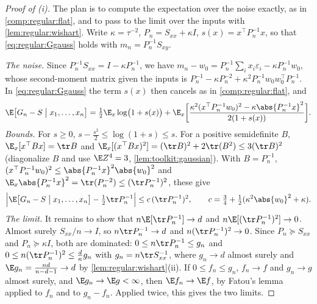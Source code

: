 \begin{refsection}
\begin{proof}[Proof of (i)]
The plan is to compute the expectation over the noise exactly, as in \cref{comp:regular:flat}, and to pass to the limit over the inputs with \cref{lem:regular:wishart}. Write $\kappa=\tau^{-2}$, $P_n=S_{xx}+\kappa I$, $s(x)=x^\top P_n^{-1}x$, so that \eqref{eq:regular:Ggauss} holds with $m_n=P_n^{-1}S_{xy}$.

\emph{The noise.} Since $P_n^{-1}S_{xx}=I-\kappa P_n^{-1}$, we have $m_n-w_0=P_n^{-1}\sum_ix_i\varepsilon_i-\kappa P_n^{-1}w_0$, whose second-moment matrix given the inputs is $P_n^{-1}-\kappa P_n^{-2}+\kappa^2P_n^{-1}w_0w_0^\top P_n^{-1}$. In \eqref{eq:regular:Ggauss} the term $s(x)$ then cancels as in \cref{comp:regular:flat}, and
\[
\E\bigl[G_n-S\bigm|x_1,\dots,x_n\bigr]=\tfrac12\E_x\log\bigl(1+s(x)\bigr)+\E_x\biggl[\frac{\kappa^2(x^\top P_n^{-1}w_0)^2-\kappa\abs{P_n^{-1}x}^2}{2(1+s(x))}\biggr].
\]
\emph{Bounds.} For $s\ge0$, $s-\frac{s^2}2\le\log(1+s)\le s$. For a positive semidefinite $B$, $\E_x[x^\top Bx]=\tr B$ and $\E_x[(x^\top Bx)^2]=(\tr B)^2+2\tr(B^2)\le3(\tr B)^2$ (diagonalize $B$ and use $\E Z^4=3$, \cref{lem:toolkit:gaussian}). With $B=P_n^{-1}$, $(x^\top P_n^{-1}w_0)^2\le\abs{P_n^{-1}x}^2\abs{w_0}^2$ and $\E_x\abs{P_n^{-1}x}^2=\tr(P_n^{-2})\le(\tr P_n^{-1})^2$, these give
\[
\Bigl|\E\bigl[G_n-S\bigm|x_1,\dots,x_n\bigr]-\tfrac12\tr P_n^{-1}\Bigr|\le c\,(\tr P_n^{-1})^2,\qquad c=\tfrac34+\tfrac12(\kappa^2\abs{w_0}^2+\kappa).
\]
\emph{The limit.} It remains to show that $n\E[\tr P_n^{-1}]\to d$ and $n\E[(\tr P_n^{-1})^2]\to0$. Almost surely $S_{xx}/n\to I$, so $n\tr P_n^{-1}\to d$ and $n(\tr P_n^{-1})^2\to0$. Since $P_n\succeq S_{xx}$ and $P_n\succeq\kappa I$, both are dominated: $0\le n\tr P_n^{-1}\le g_n$ and $0\le n(\tr P_n^{-1})^2\le\frac d\kappa g_n$ with $g_n=n\tr S_{xx}^{-1}$, where $g_n\to d$ almost surely and $\E g_n=\frac{nd}{n-d-1}\to d$ by \cref{lem:regular:wishart}(ii). If $0\le f_n\le g_n$, $f_n\to f$ and $g_n\to g$ almost surely, and $\E g_n\to\E g<\infty$, then $\E f_n\to\E f$, by Fatou's lemma applied to $f_n$ and to $g_n-f_n$. Applied twice, this gives the two limits.
\end{proof}


\end{refsection}
